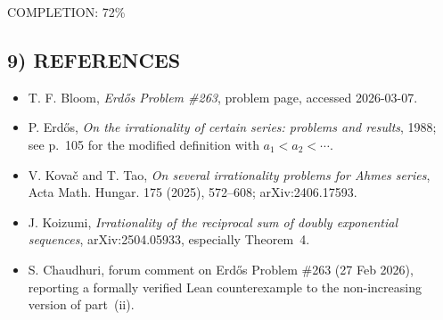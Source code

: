 COMPLETION: 72\%

\subsection*{9) REFERENCES}

\begin{itemize}
\item [EP263] T. F. Bloom, \emph{Erd\H{o}s Problem \#263}, problem page, accessed 2026-03-07.
\item [Er88c] P. Erd\H{o}s, \emph{On the irrationality of certain series: problems and results}, 1988; see p.~105 for the modified definition with $a_1<a_2<\cdots$.
\item [KoTa24] V. Kova\v{c} and T. Tao, \emph{On several irrationality problems for Ahmes series}, Acta Math. Hungar. 175 (2025), 572--608; arXiv:2406.17593.
\item [Koi25] J. Koizumi, \emph{Irrationality of the reciprocal sum of doubly exponential sequences}, arXiv:2504.05933, especially Theorem~4.
\item [Forum263] S. Chaudhuri, forum comment on Erd\H{o}s Problem \#263 (27 Feb 2026), reporting a formally verified Lean counterexample to the non-increasing version of part~(ii).
\end{itemize}
